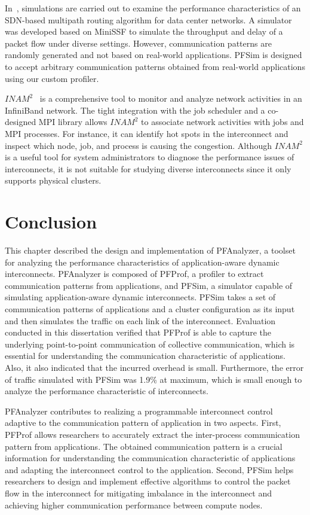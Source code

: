 In~\autocite{Jo2015}, simulations are carried out to examine the
performance characteristics of an SDN-based multipath routing algorithm
for data center networks. A simulator was developed based on MiniSSF to
simulate the throughput and delay of a packet flow under diverse
settings. However, communication patterns are randomly generated and not
based on real-world applications. PFSim is designed to accept arbitrary
communication patterns obtained from real-world applications using our custom
profiler.

\(\mathit{INAM}^2\)~\autocite{Subramoni2016} is a comprehensive tool to
monitor and analyze network activities in an InfiniBand network. The
tight integration with the job scheduler and a co-designed MPI library
allows \(\mathit{INAM}^2\) to associate network activities with jobs and
MPI processes. For instance, it can identify hot spots in the
interconnect and inspect which node, job, and process is causing the
congestion. Although \(\mathit{INAM}^2\) is a useful tool for system
administrators to diagnose the performance issues of interconnects, it
is not suitable for studying diverse interconnects since it only
supports physical clusters.

\section{Conclusion}\label{sec:ii-conclusion}

This chapter described the design and implementation of PFAnalyzer, a
toolset for analyzing the performance characteristics of
application-aware dynamic interconnects. PFAnalyzer is composed of
PFProf, a profiler to extract communication patterns from applications,
and PFSim, a simulator capable of simulating application-aware dynamic
interconnects. PFSim takes a set of communication patterns of
applications and a cluster configuration as its input and then simulates
the traffic on each link of the interconnect. Evaluation conducted in this
dissertation verified that PFProf is able to capture the underlying
point-to-point communication of collective communication, which is essential
for understanding the communication characteristic of applications. Also, it
also indicated that the incurred overhead is small. Furthermore, the error of
traffic simulated with PFSim was 1.9\% at maximum, which is small enough to
analyze the performance characteristic of interconnects.

PFAnalyzer contributes to realizing a programmable interconnect control
adaptive to the communication pattern of application in two aspects. First,
PFProf allows researchers to accurately extract the inter-process
communication pattern from applications. The obtained communication pattern is
a crucial information for understanding the communication characteristic of
applications and adapting the interconnect control to the application. Second,
PFSim helps researchers to design and implement effective algorithms to
control the packet flow in the interconnect for mitigating imbalance in the
interconnect and achieving higher communication performance between compute
nodes.

